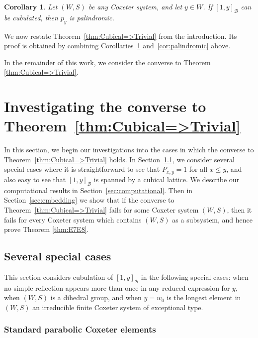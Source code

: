 \documentclass[11pt]{amsart}
\theoremstyle{plain}
\newtheorem{corollary}[thm]{Corollary}
\theoremstyle{definition}
\newcommand{\cB}{\mathcal B}
\newcommand{\Pxy}{P_{x,y}} %
\numberwithin{equation}{subsection}
\begin{document}
\begin{corollary}\label{cor:spanPal}
	Let $(W,S)$ be any Coxeter system, and let $y \in W$.  If $[1,y]_\cB$ can be cubulated, then $p_y$ is palindromic.
\end{corollary}

We now restate Theorem~\ref{thm:Cubical=>Trivial} from the introduction. Its proof is obtained by combining Corollaries~\ref{cor:spanPal} and~\ref{cor:palindromic} above.

\MainThmA



In the remainder of this work, we consider the converse to Theorem \ref{thm:Cubical=>Trivial}.





\section{Investigating the converse to Theorem~\ref{thm:Cubical=>Trivial}}\label{sec:converse}

In this section, we begin our investigations into the cases in which the converse to Theorem~\ref{thm:Cubical=>Trivial} holds. In Section~\ref{sec:exs}, we consider several special cases where it is straightforward to see that $\Pxy = 1$ for all $x \leq y$, and also easy to see that $[1,y]_\cB$ is spanned by a cubical lattice. We describe our computational results in Section~\ref{sec:computational}. Then in Section~\ref{sec:embedding} we show that if the converse to Theorem~\ref{thm:Cubical=>Trivial} fails for some Coxeter system $(W,S)$, then it fails for every Coxeter system which contains $(W,S)$ as a subsystem, and hence prove Theorem \ref{thm:E7E8}.



\subsection{Several special cases}\label{sec:exs}

This section considers cubulation of $[1,y]_\cB$ in the following special cases: when no simple reflection appears more than once in any reduced expression for $y$, when $(W,S)$ is a dihedral group, and when $y = w_0$ is the longest element in $(W,S)$ an irreducible finite Coxeter system of exceptional type.


\subsubsection{Standard parabolic Coxeter elements}\label{sec:boolean} 
\end{document}
